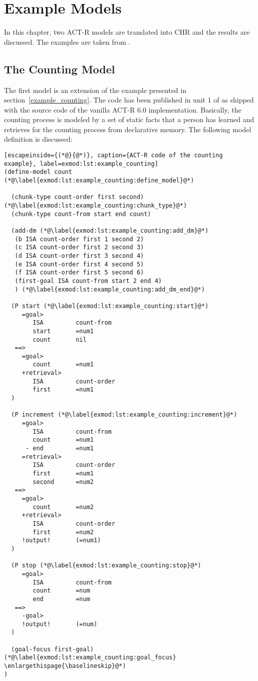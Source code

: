 \chapter{Example Models}
\label{example_models}

In this chapter, two ACT-R models are translated into CHR and the results are discussed. The examples are taken from  \cite{actr_tutorial}.

\section{The Counting Model}

The first model is an extension of the example presented in section~\ref{example_counting}. The code has been published in unit 1 of  \cite{actr_tutorial} as shipped with the source code of the vanilla ACT-R 6.0 implementation. Basically, the counting process is modeled by a set of static facts that a person has learned and retrieves for the counting process from declarative memory. The following model definition is discussed:

\raggedbottom
\begin{lstlisting}[escapeinside={(*@}{@*)}, caption={ACT-R code of the counting example}, label=exmod:lst:example_counting]
(define-model count (*@\label{exmod:lst:example_counting:define_model}@*)

  (chunk-type count-order first second) (*@\label{exmod:lst:example_counting:chunk_type}@*)
  (chunk-type count-from start end count)

  (add-dm (*@\label{exmod:lst:example_counting:add_dm}@*)
   (b ISA count-order first 1 second 2)
   (c ISA count-order first 2 second 3)
   (d ISA count-order first 3 second 4)
   (e ISA count-order first 4 second 5)
   (f ISA count-order first 5 second 6)
   (first-goal ISA count-from start 2 end 4)
   ) (*@\label{exmod:lst:example_counting:add_dm_end}@*)

  (P start (*@\label{exmod:lst:example_counting:start}@*)
     =goal>
        ISA         count-from
        start       =num1
        count       nil
   ==>
     =goal>
        count       =num1
     +retrieval>
        ISA         count-order
        first       =num1
  )

  (P increment (*@\label{exmod:lst:example_counting:increment}@*)
     =goal>
        ISA         count-from
        count       =num1
      - end         =num1
     =retrieval>
        ISA         count-order
        first       =num1
        second      =num2
   ==>
     =goal>
        count       =num2
     +retrieval>
        ISA         count-order
        first       =num2
     !output!       (=num1)
  )

  (P stop (*@\label{exmod:lst:example_counting:stop}@*)
     =goal>
        ISA         count-from
        count       =num
        end         =num
   ==>
     -goal>
     !output!       (=num)
  )
  
  (goal-focus first-goal) (*@\label{exmod:lst:example_counting:goal_focus} \enlargethispage{\baselineskip}@*)
) 
\end{lstlisting}
\flushbottom

